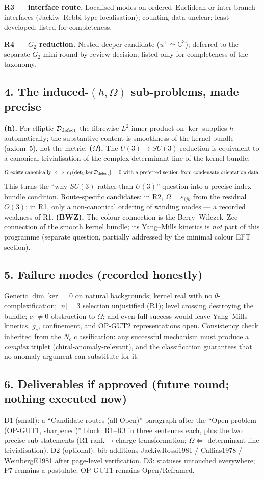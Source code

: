 \textbf{R3 --- interface route.}
Localised modes on ordered--Euclidean or inter-branch interfaces
(Jackiw--Rebbi-type localisation); counting data unclear; least
developed; listed for completeness.

\textbf{R4 --- $G_2$ reduction.}
Nested deeper candidate ($u^\perp\simeq\mathbb C^3$); deferred to
the separate $G_2$ mini-round by review decision; listed only for
completeness of the taxonomy.

\subsection*{4. The induced-$(h,\Omega)$ sub-problems, made
precise}
\textbf{(h).} For elliptic $\mathcal D_{\rm defect}$ the
fibrewise $L^2$ inner product on $\ker$ supplies $h$
automatically; the substantive content is smoothness of the
kernel bundle (axiom~5), not the metric.
\textbf{($\Omega$).} The $U(3)\to SU(3)$ reduction is equivalent
to a canonical trivialisation of the complex determinant line of
the kernel bundle:
\[
\Omega\ \text{exists canonically}
\iff
c_1\bigl(\det\nolimits_{\mathbb C}\ker\mathcal D_{\rm defect}\bigr)=0
\ \text{with a preferred section from condensate orientation data.}
\]
This turns the ``why $SU(3)$ rather than $U(3)$'' question into a
precise index-bundle condition.
Route-specific candidates: in R2, $\Omega=\varepsilon_{ijk}$ from
the residual $O(3)$; in R1, only a non-canonical ordering of
winding modes --- a recorded weakness of R1.
\textbf{(BWZ).} The colour connection is the Berry--Wilczek--Zee
connection of the smooth kernel bundle; its Yang--Mills kinetics
is \emph{not} part of this programme (separate question, partially
addressed by the minimal colour EFT section).

\subsection*{5. Failure modes (recorded honestly)}
Generic $\dim\ker=0$ on natural backgrounds; kernel real with no
$\theta$-complexification; $|n|=3$ selection unjustified (R1);
level crossing destroying the bundle; $c_1\neq0$ obstruction to
$\Omega$; and even full success would leave Yang--Mills kinetics,
$g_s$, confinement, and OP-GUT2 representations open.
Consistency check inherited from the $N_c$ classification: any
successful mechanism must produce a \emph{complex} triplet
(chiral-anomaly-relevant), and the classification guarantees that
no anomaly argument can substitute for it.

\subsection*{6. Deliverables if approved (future round; nothing
executed now)}
D1 (small): a ``Candidate routes (all Open)'' paragraph after the
``Open problem (OP-GUT1, sharpened)'' block: R1--R3 in three
sentences each, plus the two precise sub-statements (R1
rank$\to$charge transformation; $\Omega\iff$ determinant-line
trivialisation).
D2 (optional): bib additions JackiwRossi1981 / Callias1978 /
WeinbergE1981 after page-level verification.
D3: statuses untouched everywhere; P7 remains a postulate;
OP-GUT1 remains Open/Reframed.

